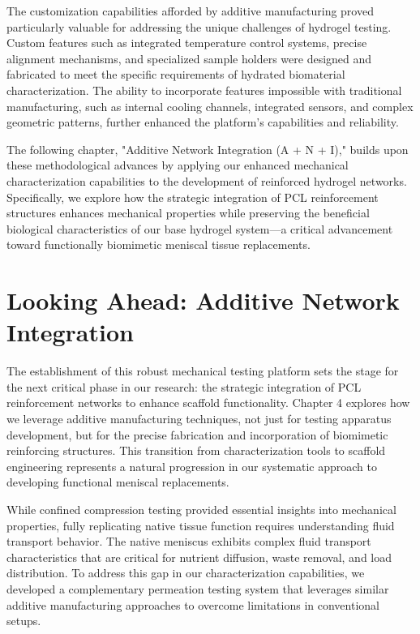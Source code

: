 The customization capabilities afforded by additive manufacturing proved particularly valuable for addressing the unique challenges of hydrogel testing. Custom features such as integrated temperature control systems, precise alignment mechanisms, and specialized sample holders were designed and fabricated to meet the specific requirements of hydrated biomaterial characterization. The ability to incorporate features impossible with traditional manufacturing, such as internal cooling channels, integrated sensors, and complex geometric patterns, further enhanced the platform's capabilities and reliability.

The following chapter, "Additive Network Integration (A + N + I)," builds upon these methodological advances by applying our enhanced mechanical characterization capabilities to the development of reinforced hydrogel networks. Specifically, we explore how the strategic integration of PCL reinforcement structures enhances mechanical properties while preserving the beneficial biological characteristics of our base hydrogel system—a critical advancement toward functionally biomimetic meniscal tissue replacements.

\clearpage
\section{Looking Ahead: Additive Network Integration}

The establishment of this robust mechanical testing platform sets the stage for the next critical phase in our research: the strategic integration of PCL reinforcement networks to enhance scaffold functionality. Chapter 4 explores how we leverage additive manufacturing techniques, not just for testing apparatus development, but for the precise fabrication and incorporation of biomimetic reinforcing structures. This transition from characterization tools to scaffold engineering represents a natural progression in our systematic approach to developing functional meniscal replacements.

While confined compression testing provided essential insights into mechanical properties, fully replicating native tissue function requires understanding fluid transport behavior. The native meniscus exhibits complex fluid transport characteristics that are critical for nutrient diffusion, waste removal, and load distribution. To address this gap in our characterization capabilities, we developed a complementary permeation testing system that leverages similar additive manufacturing approaches to overcome limitations in conventional setups.

